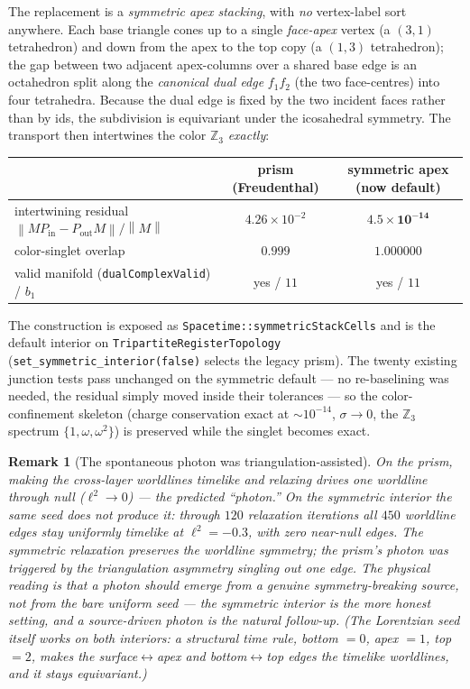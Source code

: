 \documentclass[11pt]{article}
\newtheorem{remark}{Remark}
\newcommand{\Z}{\mathbb{Z}}
\newcommand{\norm}[1]{\left\lVert #1 \right\rVert}
\newcommand{\sigmacol}{\sigma}
\newcommand{\Pin}{P_{\mathrm{in}}}
\newcommand{\Pout}{P_{\mathrm{out}}}
\begin{document}
The replacement is a \emph{symmetric apex stacking}, with \emph{no} vertex-label sort
anywhere. Each base triangle cones up to a single \emph{face-apex} vertex (a $(3,1)$
tetrahedron) and down from the apex to the top copy (a $(1,3)$ tetrahedron); the gap
between two adjacent apex-columns over a shared base edge is an octahedron split along the
\emph{canonical dual edge} $f_1 f_2$ (the two face-centres) into four tetrahedra. Because
the dual edge is fixed by the two incident faces rather than by ids, the subdivision is
equivariant under the icosahedral symmetry. The transport then intertwines the color
$\Z_3$ \emph{exactly}:

\begin{center}
\small
\begin{tabular}{@{}lcc@{}}
\toprule
 & prism (Freudenthal) & \textbf{symmetric apex (now default)}\\
\midrule
intertwining residual $\norm{M\Pin-\Pout M}/\norm{M}$ & $4.26\times10^{-2}$ & $\mathbf{4.5\times10^{-14}}$\\
color-singlet overlap & $0.999$ & $\mathbf{1.000000}$\\
valid manifold (\texttt{dualComplexValid}) / $b_1$ & yes / $11$ & yes / $11$\\
\bottomrule
\end{tabular}
\end{center}

\noindent The construction is exposed as \texttt{Spacetime::symmetricStackCells} and is
the default interior on \texttt{TripartiteRegisterTopology}
(\texttt{set\_symmetric\_interior(false)} selects the legacy prism). The twenty existing
junction tests pass unchanged on the symmetric default --- no re-baselining was needed,
the residual simply moved inside their tolerances --- so the color-confinement skeleton
(charge conservation exact at $\sim10^{-14}$, $\sigmacol\to0$, the $\Z_3$ spectrum
$\{1,\omega,\omega^2\}$) is preserved while the singlet becomes exact.

\begin{remark}[The spontaneous photon was triangulation-assisted]
\label{rem:photon}
On the prism, making the cross-layer worldlines timelike and relaxing drives one
worldline through null ($\ell^2\to0$) --- the predicted ``photon.'' On the symmetric
interior the same seed does \emph{not} produce it: through $120$ relaxation iterations all
$450$ worldline edges stay uniformly timelike at $\ell^2=-0.3$, with \emph{zero} near-null
edges. The symmetric relaxation preserves the worldline symmetry; the prism's photon was
triggered by the triangulation asymmetry singling out one edge. The physical reading is
that a photon should emerge from a genuine symmetry-breaking \emph{source}, not from the
bare uniform seed --- the symmetric interior is the more honest setting, and a
source-driven photon is the natural follow-up. (The Lorentzian seed itself works on both
interiors: a structural time rule, bottom $=0$, apex $=1$, top $=2$, makes the
surface$\leftrightarrow$apex and bottom$\leftrightarrow$top edges the timelike worldlines,
and it stays equivariant.)
\end{remark}
\end{document}
